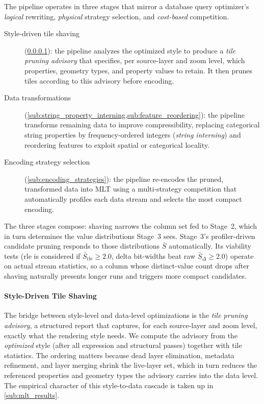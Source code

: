 The pipeline operates in three stages that mirror a database query optimizer's \emph{logical} rewriting, \emph{physical} strategy selection, and \emph{cost-based} competition.

\begin{description}
    \item[Style-driven tile shaving] (\cref{sub:tile_shaving}): the pipeline analyzes the optimized style to produce a \emph{tile pruning advisory} that specifies, per source-layer and zoom level, which properties, geometry types, and property values to retain.
    It then prunes tiles according to this advisory before encoding.
    \item[Data transformations] (\cref{sub:string_property_interning,sub:feature_reordering}): the pipeline transforms remaining data to improve compressibility, replacing categorical string properties by frequency-ordered integers (\emph{string interning}) and reordering features to exploit spatial or categorical locality.
    \item[Encoding strategy selection] (\cref{sub:encoding_strategies}): the pipeline re-encodes the pruned, transformed data into \ac{MLT} using a multi-strategy competition that automatically profiles each data stream and selects the most compact encoding.
\end{description}

\noindent The three stages compose:
shaving narrows the column set fed to Stage~2, which in turn determines the value distributions Stage~3 sees.
Stage~3's profiler-driven candidate pruning responds to those distributions $\bar{S}$ automatically.
Its viability tests (rle is considered if $\bar{S}_\text{rle} \geq 2.0$, delta bit-widths beat raw $\bar{S}_\Delta \geq 2.0$) operate on actual stream statistics, so a column whose distinct-value count drops after shaving naturally presents longer runs and triggers more compact candidates.

\paragraph{Style-Driven Tile Shaving}\label{sub:tile_shaving}

The bridge between style-level and data-level optimizations is the \emph{tile pruning advisory}, a structured report that captures, for each source-layer and zoom level, exactly what the rendering style needs.
We compute the advisory from the \emph{optimized} style (after all expression and structural passes) together with tile statistics.
The ordering matters because dead layer elimination, metadata refinement, and layer merging shrink the live-layer set, which in turn reduces the referenced properties and geometry types the advisory carries into the data level.
The empirical character of this style-to-data cascade is taken up in \cref{sub:mlt_results}.


